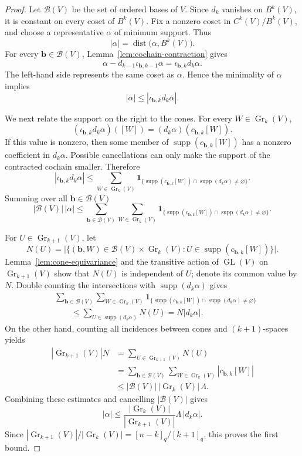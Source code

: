 \documentclass[10pt,a4paper]{amsart}
\newcommand{\Gr}{\operatorname{Gr}}
\newcommand{\supp}{\operatorname{supp}}
\begin{document}
\begin{proof}
Let $\mathcal B(V)$ be the set of ordered bases of $V$. Since $d_k$
vanishes on $B^k(V)$, it is constant on every coset of $B^k(V)$.
Fix a nonzero coset in $C^k(V)/B^k(V)$, and choose a representative
$\alpha$ of minimum support. Thus
\[
 |\alpha|
 =
 \operatorname{dist}\bigl(\alpha,B^k(V)\bigr).
\]
For every $\mathbf b\in\mathcal B(V)$,
Lemma~\ref{lem:cochain-contraction} gives
\[
 \alpha-d_{k-1}\iota_{\mathbf b,k-1}\alpha
 =
 \iota_{\mathbf b,k}d_k\alpha.
\]
The left-hand side represents the same coset as $\alpha$. Hence the
minimality of $\alpha$ implies
\[
 |\alpha|\le|\iota_{\mathbf b,k}d_k\alpha|.
\]

We next relate the support on the right to the cones. For every
$W\in\Gr_k(V)$,
\[
 (\iota_{\mathbf b,k}d_k\alpha)([W])
 =
 (d_k\alpha)(c_{\mathbf b,k}[W]).
\]
If this value is nonzero, then some member of
$\supp(c_{\mathbf b,k}[W])$ has a nonzero coefficient in
$d_k\alpha$. Possible cancellations can only make the support of the
contracted cochain smaller. Therefore
\[
 |\iota_{\mathbf b,k}d_k\alpha|
 \le
 \sum_{W\in\Gr_k(V)}
 \mathbf 1_{\{
 \supp(c_{\mathbf b,k}[W])
 \cap\supp(d_k\alpha)\ne\varnothing\}}.
\]
Summing over all $\mathbf b \in \mathcal B(V) $
\[
 |\mathcal B(V)|\,|\alpha|
 \le
 \sum_{\mathbf b\in\mathcal B(V)}
 \sum_{W\in\Gr_k(V)}
 \mathbf 1_{\{
 \supp(c_{\mathbf b,k}[W])
 \cap\supp(d_k\alpha)\ne\varnothing\}}.
\]

For $U\in\Gr_{k+1}(V)$, let
\[
 N(U)
 =
 \bigl|\{(\mathbf b,W)\in\mathcal B(V)\times\Gr_k(V):
 U\in\supp(c_{\mathbf b,k}[W])\}\bigr|.
\]
Lemma~\ref{lem:cone-equivariance} and the transitive action of
$\operatorname{GL}(V)$ on $\Gr_{k+1}(V)$ show that $N(U)$ is
independent of $U$; denote its common value by $N$. Double counting
the intersections with $\supp(d_k\alpha)$ gives
\begin{align*}
 &\sum_{\mathbf b\in\mathcal B(V)}
 \sum_{W\in\Gr_k(V)}
 \mathbf 1_{\{
 \supp(c_{\mathbf b,k}[W])
 \cap\supp(d_k\alpha)\ne\varnothing\}}\\
 &\qquad\le
 \sum_{U\in\supp(d_k\alpha)}N(U)
 =
 N|d_k\alpha|.
\end{align*}
On the other hand, counting all incidences between cones and
$(k+1)$-spaces yields
\begin{align*}
 |\Gr_{k+1}(V)|N
 &=
 \sum_{U\in\Gr_{k+1}(V)}N(U)\\
 &=
 \sum_{\mathbf b\in\mathcal B(V)}
 \sum_{W\in\Gr_k(V)}
 |c_{\mathbf b,k}[W]|\\
 &\le
 |\mathcal B(V)|\,|\Gr_k(V)|\,\Lambda.
\end{align*}
Combining these estimates and cancelling $|\mathcal B(V)|$ gives
\[
 |\alpha|
 \le
 \frac{|\Gr_k(V)|}{|\Gr_{k+1}(V)|}
 \Lambda\,|d_k\alpha|.
\]
Since
$|\Gr_{k+1}(V)|/|\Gr_k(V)|=[n-k]_q/[k+1]_q$, this proves the first
bound.


\end{proof}
\end{document}

